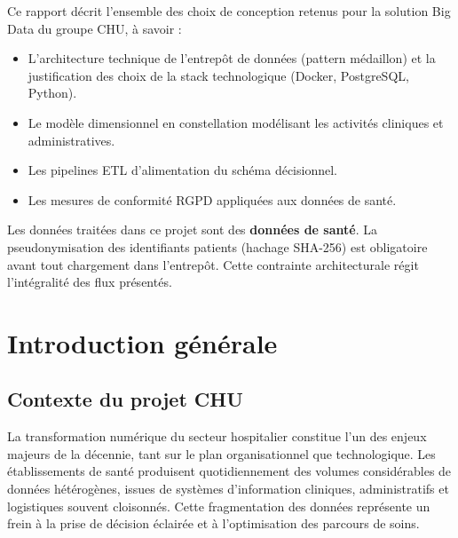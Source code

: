 \documentclass[12pt, a4paper]{report}
\begin{document}
Ce rapport décrit l'ensemble des choix de conception retenus pour la solution Big Data du groupe CHU, à savoir :
\begin{itemize}[leftmargin=1.5cm, label=\textcolor{chuBlue}{\textbullet}]
    \item L'architecture technique de l'entrepôt de données (pattern médaillon) et la justification des choix de la stack technologique (Docker, PostgreSQL, Python).
    \item Le modèle dimensionnel en constellation modélisant les activités cliniques et administratives.
    \item Les pipelines ETL d'alimentation du schéma décisionnel.
    \item Les mesures de conformité RGPD appliquées aux données de santé.
\end{itemize}

\vspace{0.5cm}
\begin{rgpdbox}
Les données traitées dans ce projet sont des \textbf{données de santé}. La pseudonymisation des identifiants patients (hachage SHA-256) est obligatoire avant tout chargement dans l'entrepôt. Cette contrainte architecturale régit l'intégralité des flux présentés.
\end{rgpdbox}

\clearpage
\tableofcontents
\clearpage

\chapter{Introduction générale}

\section{Contexte du projet CHU}
La transformation numérique du secteur hospitalier constitue l'un des enjeux majeurs de la décennie, tant sur le plan organisationnel que technologique. Les établissements de santé produisent quotidiennement des volumes considérables de données hétérogènes, issues de systèmes d'information cliniques, administratifs et logistiques souvent cloisonnés. Cette fragmentation des données représente un frein à la prise de décision éclairée et à l'optimisation des parcours de soins.
\end{document}
